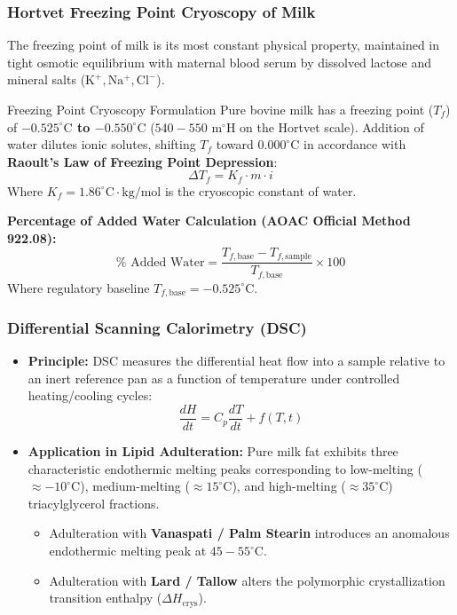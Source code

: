 \documentclass[11pt,a4paper,oneside]{article}
\begin{document}
\subsubsection{Hortvet Freezing Point Cryoscopy of Milk}
The freezing point of milk is its most constant physical property, maintained in tight osmotic equilibrium with maternal blood serum by dissolved lactose and mineral salts ($\mathrm{K^+, Na^+, Cl^-}$).

\begin{formulabox}{Freezing Point Cryoscopy Formulation}
Pure bovine milk has a freezing point ($T_f$) of \textbf{$-0.525^\circ\text{C}$ to $-0.550^\circ\text{C}$} ($540-550\text{ m}^\circ\text{H}$ on the Hortvet scale).
Addition of water dilutes ionic solutes, shifting $T_f$ toward $0.000^\circ\text{C}$ in accordance with \textbf{Raoult's Law of Freezing Point Depression}:
$$\Delta T_f = K_f \cdot m \cdot i$$
Where $K_f = 1.86^\circ\text{C}\cdot\text{kg/mol}$ is the cryoscopic constant of water.

\textbf{Percentage of Added Water Calculation (AOAC Official Method 922.08):}
$$\% \text{ Added Water} = \frac{T_{f,\text{base}} - T_{f,\text{sample}}}{T_{f,\text{base}}} \times 100$$
Where regulatory baseline $T_{f,\text{base}} = -0.525^\circ\text{C}$.
\end{formulabox}

\subsubsection{Differential Scanning Calorimetry (DSC)}
\begin{itemize}[leftmargin=*]
    \item \textbf{Principle:} DSC measures the differential heat flow into a sample relative to an inert reference pan as a function of temperature under controlled heating/cooling cycles:
    $$\frac{dH}{dt} = C_p \frac{dT}{dt} + f(T, t)$$
    \item \textbf{Application in Lipid Adulteration:} Pure milk fat exhibits three characteristic endothermic melting peaks corresponding to low-melting ($\approx -10^\circ\text{C}$), medium-melting ($\approx 15^\circ\text{C}$), and high-melting ($\approx 35^\circ\text{C}$) triacylglycerol fractions.
    \begin{itemize}
        \item Adulteration with \textbf{Vanaspati / Palm Stearin} introduces an anomalous endothermic melting peak at \textbf{$45-55^\circ\text{C}$}.
        \item Adulteration with \textbf{Lard / Tallow} alters the polymorphic crystallization transition enthalpy ($\Delta H_{\text{crys}}$).
    \end{itemize}
\end{itemize}
\end{document}
